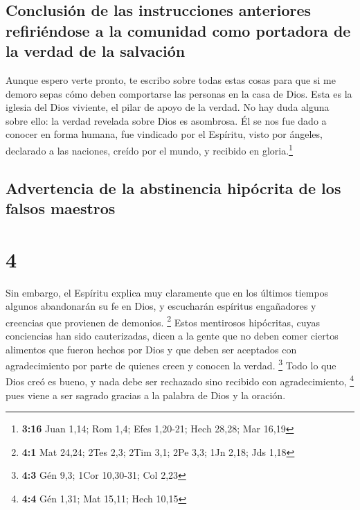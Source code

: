 \hypertarget{conclusiuxf3n-de-las-instrucciones-anteriores-refiriuxe9ndose-a-la-comunidad-como-portadora-de-la-verdad-de-la-salvaciuxf3n}{%
\subsection{Conclusión de las instrucciones anteriores refiriéndose a la
comunidad como portadora de la verdad de la
salvación}\label{conclusiuxf3n-de-las-instrucciones-anteriores-refiriuxe9ndose-a-la-comunidad-como-portadora-de-la-verdad-de-la-salvaciuxf3n}}

 Aunque espero verte pronto, te escribo sobre todas estas
cosas para que  si me demoro sepas cómo deben comportarse
las personas en la casa de Dios. Esta es la iglesia del Dios viviente,
el pilar de apoyo de la verdad.  No hay duda alguna sobre
ello: la verdad revelada sobre Dios es asombrosa. Él se nos fue dado a
conocer en forma humana, fue vindicado por el Espíritu, visto por
ángeles, declarado a las naciones, creído por el mundo, y recibido en
gloria.\footnote{\textbf{3:16} Juan 1,14; Rom 1,4; Efes 1,20-21; Hech
  28,28; Mar 16,19}

\hypertarget{advertencia-de-la-abstinencia-hipuxf3crita-de-los-falsos-maestros}{%
\subsection{Advertencia de la abstinencia hipócrita de los falsos
maestros}\label{advertencia-de-la-abstinencia-hipuxf3crita-de-los-falsos-maestros}}

\hypertarget{section-3}{%
\section{4}\label{section-3}}

 Sin embargo, el Espíritu explica muy claramente que en
los últimos tiempos algunos abandonarán su fe en Dios, y escucharán
espíritus engañadores y creencias que provienen de demonios. \footnote{\textbf{4:1}
  Mat 24,24; 2Tes 2,3; 2Tim 3,1; 2Pe 3,3; 1Jn 2,18; Jds 1,18}
 Estos mentirosos hipócritas, cuyas conciencias han sido
cauterizadas,  dicen a la gente que no deben comer ciertos
alimentos que fueron hechos por Dios y que deben ser aceptados con
agradecimiento por parte de quienes creen y conocen la verdad.
\footnote{\textbf{4:3} Gén 9,3; 1Cor 10,30-31; Col 2,23} 
Todo lo que Dios creó es bueno, y nada debe ser rechazado sino recibido
con agradecimiento, \footnote{\textbf{4:4} Gén 1,31; Mat 15,11; Hech
  10,15}  pues viene a ser sagrado gracias a la palabra de
Dios y la oración.


